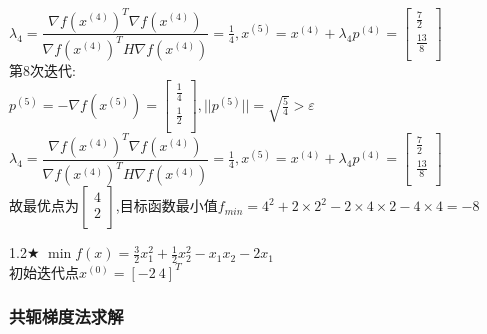 \begin{solution}
$\lambda_4=\dfrac{\nabla f(x^{(4)})^T\nabla f(x^{(4)})}{\nabla f(x^{(4)})^TH\nabla f(x^{(4)})}=\frac{1}{4},x^{(5)}=x^{(4)}+\lambda_4p^{(4)}=\begin{bmatrix} \frac{7}{2}\\\frac{13}{8}\\\end{bmatrix}$\\
第8次迭代:\\
$p^{(5)}=-\nabla f(x^{(5)})=\begin{bmatrix} \frac{1}{4}\\\frac{1}{2}\\\end{bmatrix},||p^{(5)}||=\sqrt{\frac{5}{4}}>\varepsilon$\\
$\lambda_4=\dfrac{\nabla f(x^{(4)})^T\nabla f(x^{(4)})}{\nabla f(x^{(4)})^TH\nabla f(x^{(4)})}=\frac{1}{4},x^{(5)}=x^{(4)}+\lambda_4p^{(4)}=\begin{bmatrix} \frac{7}{2}\\\frac{13}{8}\\\end{bmatrix}$\\
故最优点为$\begin{bmatrix} 4\\2\\\end{bmatrix}$,目标函数最小值$f_{min}=4^2+2\times2^2-2\times4\times2-4\times4=-8$
\end{solution}

\begin{problem}{1.2$\bigstar$}
    $\min f(x)=\frac{3}{2}x_1^2+\frac{1}{2}x_2^2-x_1x_2-2x_1$\\
初始迭代点${x^{(0)}}=[-2\ 4]^T$
\end{problem}
\begin{solution}


\end{solution}

\subsubsection{共轭梯度法求解}

